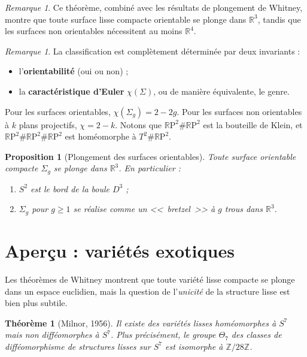 \documentclass[12pt,a4paper,openany]{book}
\theoremstyle{definition}
\theoremstyle{plain}
\newtheorem{theoreme}[definition]{Théorème}
\newtheorem{proposition}[definition]{Proposition}
\theoremstyle{remark}
\newtheorem{remarque}[definition]{Remarque}
\newcommand{\Z}{\mathbb{Z}}
\newcommand{\R}{\mathbb{R}}
\newcommand{\RP}{\mathbb{R}\mathrm{P}}
\begin{document}
\begin{remarque}
Ce théorème, combiné avec les résultats de plongement de Whitney, montre que
toute surface lisse compacte orientable se plonge dans $\R^3$, tandis que les
surfaces non orientables nécessitent au moins $\R^4$.
\end{remarque}

\begin{remarque}
La classification est complètement déterminée par deux invariants :
\begin{itemize}
  \item l'\textbf{orientabilité} (oui ou non) ;
  \item la \textbf{caractéristique d'Euler} $\chi(\Sigma)$, ou de manière
    équivalente, le genre.
\end{itemize}
Pour les surfaces orientables, $\chi(\Sigma_g) = 2 - 2g$. Pour les surfaces non
orientables à $k$ plans projectifs, $\chi = 2 - k$. Notons que
$\RP^2 \# \RP^2$ est la bouteille de Klein, et $\RP^2 \# \RP^2 \# \RP^2$ est
homéomorphe à $T^2 \# \RP^2$.
\end{remarque}

\begin{proposition}[Plongement des surfaces orientables]\label{prop:plongement-surfaces}
Toute surface orientable compacte $\Sigma_g$ se plonge dans $\R^3$. En
particulier :
\begin{enumerate}[label=(\roman*)]
  \item $S^2$ est le bord de la boule $D^3$ ;
  \item $\Sigma_g$ pour $g \geqslant 1$ se réalise comme un <<~bretzel~>> à $g$
    trous dans $\R^3$.
\end{enumerate}
\end{proposition}

\section{Aperçu : variétés exotiques}\label{sec:varietes-exotiques}

Les théorèmes de Whitney montrent que toute variété lisse compacte se plonge dans
un espace euclidien, mais la question de l'\emph{unicité} de la structure lisse
est bien plus subtile.

\begin{theoreme}[Milnor, 1956]\label{thm:milnor-exotiques}
Il existe des variétés lisses homéomorphes à $S^7$ mais non difféomorphes à
$S^7$. Plus précisément, le groupe $\Theta_7$ des classes de difféomorphisme de
structures lisses sur $S^7$ est isomorphe à $\Z/28\Z$.
\end{theoreme}
\end{document}
